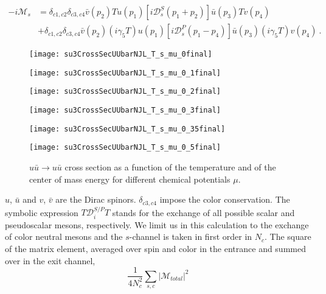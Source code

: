 \documentclass[a4paper]{jpconf}
\begin{document}
\begin{equation}
\begin{split}
-i \mathcal{M}_s &= \delta_{c1,c2} \delta_{c3,c4} \bar{v}(p_2) T u(p_1) [i \mathcal{D}_s^S(p_1 + p_2)]\bar{u}(p_3) T v(p_4)\\
& + \delta_{c1,c2} \delta_{c3,c4} \bar{v}(p_2)(i \gamma_5 T) u(p_1) [i \mathcal{D}_s^P(p_1 - p_4)]\bar{u}(p_3) (i \gamma_5 T) v(p_4) \ .
\end{split}
\label{Eq:4.3}
\end{equation}
\begin{figure}[htp]%
\centering
\begin{minipage}{0.49\textwidth}
\centering
\texttt{[image: su3CrossSecUUbarNJL\_T\_s\_mu\_0final]}
\end{minipage}
\hfill
\begin{minipage}{0.49\textwidth}
\texttt{[image: su3CrossSecUUbarNJL\_T\_s\_mu\_0\_1final]}
\end{minipage}
\hfill
\begin{minipage}{0.49\textwidth}
\texttt{[image: su3CrossSecUUbarNJL\_T\_s\_mu\_0\_2final]}
\end{minipage}
\hfill
\begin{minipage}{0.49\textwidth}
\texttt{[image: su3CrossSecUUbarNJL\_T\_s\_mu\_0\_3final]}
\end{minipage}
\hfill
\begin{minipage}{0.49\textwidth}
\texttt{[image: su3CrossSecUUbarNJL\_T\_s\_mu\_0\_35final]}
\end{minipage}
\begin{minipage}{0.49\textwidth}
\texttt{[image: su3CrossSecUUbarNJL\_T\_s\_mu\_0\_5final]}
\end{minipage}
\caption{\label{fig:uubar}$u\bar u \rightarrow u\bar u$ cross section as a function of the temperature and of the center of mass energy for different chemical potentials $\mu$.}
\end{figure}
 $u$, $\bar{u}$ and $v$, $\bar{v}$ are the Dirac spinors. $\delta_{c3,c4}$ impose the color conservation. The symbolic expression 
 $T \mathcal{D}_i^{S/P} T$ stands for the exchange of all possible scalar and pseudoscalar mesons, respectively. We limit us in this calculation to the exchange of color neutral mesons and the $s$-channel is taken
in first order in $N_c$. 
The square of the matrix element, averaged over spin and color in  the entrance and summed over in the exit channel,
\begin{equation}
\frac{1}{4 N_c^2}  \sum_{s,c} |\mathcal{M}_{total}|^2 
\end{equation}
\end{document}
